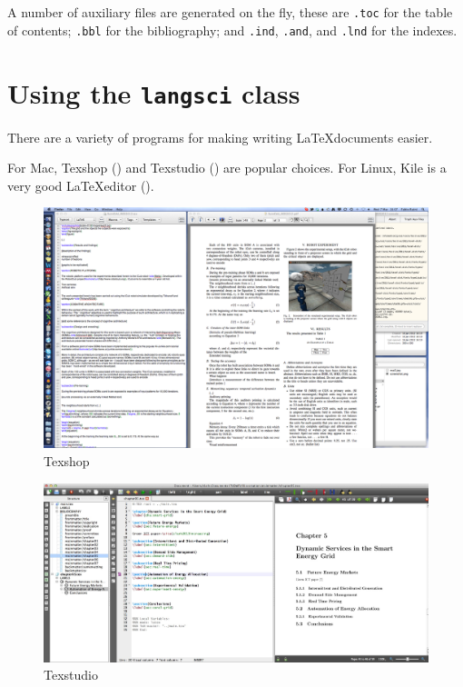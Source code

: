 A number of auxiliary files are generated on the fly, these are  \verb+.toc+ for the table of contents; \verb+.bbl+ for the bibliography; and \verb+.ind+, \verb+.and+, and \verb+.lnd+ for the indexes.  

\section{Using the \texttt{langsci} class}
There are a variety of programs for making writing \LaTeX documents easier.

For Mac, Texshop () and Texstudio () are popular choices.
For Linux, Kile is a very good \LaTeX editor ().



\begin{figure}
\includegraphics[height=.4\textheight]{texshop.png}
\caption{Texshop}
\label{fig:latex:texshop} 
\end{figure}

\begin{figure}
\includegraphics[width=\textwidth]{texstudio.jpg}
\caption{Texstudio}
\label{fig:latex:texstudio} 
\end{figure}


